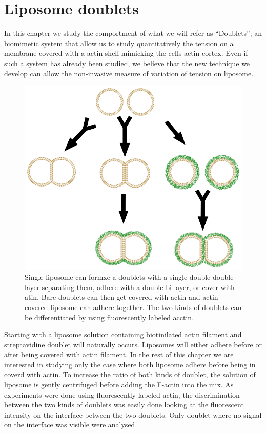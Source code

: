 \documentclass[A4paperpaper,11pt,english]{sphinxmanual}
\begin{document}
\chapter{Liposome doublets}
\label{parts/physicalparameters:liposome-doublets}
In this chapter we study the comportment of what we will refer as ``Doublets'';
an biomimetic system that allow us to study quantitatively the tension on a
membrane covered with a actin shell mimicking the cells actin cortex. Even if
such a system has already been studied, we believe that the new technique we
develop can allow the non-invasive measure of variation of tension on liposome.
\begin{figure}[htbp]
\centering
\capstart

\includegraphics{doublets-schema.png}
\caption{Single liposome can formxe a doublets with a single double double layer
separating them, adhere with a double bi-layer, or cover with atin.  Bare
doublets can then get covered with actin and actin covered liposome can
adhere together. The two kinds of doublets can be differentiated by using
fluorescently labeled acctin.}\label{parts/physicalparameters:figdoubletsschema}\end{figure}

Starting with a liposome solution containing
biotinilated actin filament and streptavidine doublet will naturally
occurs. Liposomes will either adhere before or after being covered with
actin filament. In the rest of this chapter we are interested in studying
only the case where both liposome adhere before being in coverd with actin.
To increase the ratio of both kinds of doublet, the solution of liposome is
gently centrifuged before adding the F-actin into the mix. As experiments
were done using fluorescently labeled actin, the discrimination between the
two kinds of doublets was easily done looking at the fluorescent intensity
on the interface between the two doublets. Only doublet where no signal on
the interface was visible were analysed.
\end{document}
